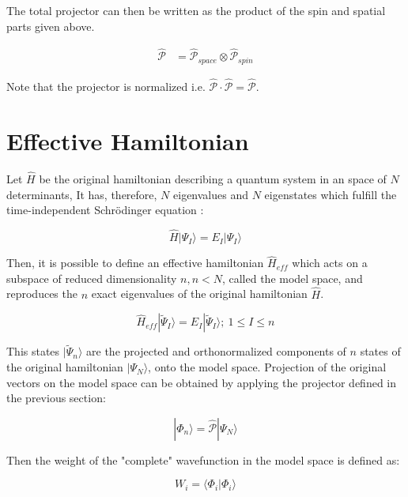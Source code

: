 \documentclass[12pt,twoside]{report}
\begin{document}
	The total projector can then be written as the product of the spin
	and spatial parts given above.

	\begin{equation}
		\begin{split}
			\hat{\mathcal{P}} & = \hat{\mathcal{P}}_{space}\otimes\hat{\mathcal{P}}_{spin}
		\end{split}
		\label{eq:demodel}
	\end{equation}

	Note that the projector is normalized i.e.
	$\hat{\mathcal{P}}\cdot\hat{\mathcal{P}} = \hat{\mathcal{P}}$.

	\section{Effective Hamiltonian}

	Let $\hat{H}$ be the original hamiltonian describing a quantum system in
	an space of $N$ determinants, It has, therefore, $N$ eigenvalues and $N$
	eigenstates which fulfill the time-independent Schrödinger equation :

	\begin{equation}
	    \hat{H} |\Psi_I\rangle=E_I|\Psi_I\rangle
	\end{equation}

	Then, it is possible to define an effective hamiltonian $\hat{H}_{eff}$ which
	acts on a subspace of reduced dimensionality $n, n<N$, called the model space,
	and reproduces the $n$ exact eigenvalues of the original hamiltonian
	$\hat{H}$.

	\begin{equation}
	    \hat{H}_{eff} |\tilde{\Psi}_I\rangle=E_I|\tilde{\Psi}_I\rangle;\ 1 \le I \le n
	\end{equation}

	This states $|\tilde{\Psi}_n\rangle$ are the projected and orthonormalized
	components of $n$ states of the original hamiltonian $|\Psi_N\rangle$, onto
	the model space.  Projection of the original vectors on the model space can
	be obtained by applying the projector defined in the previous section:

	\begin{equation}
	    |\Phi_n\rangle=\hat{\mathcal{P}}|\Psi_N\rangle
	\end{equation}

	Then the weight of the "complete" wavefunction in the model space is defined as:

	\begin{equation}
	    W_i =\langle \Phi_i|\Phi_i\rangle
	\end{equation}
\end{document}
